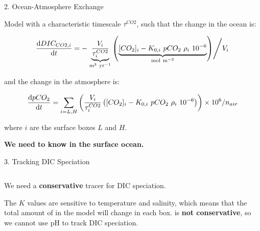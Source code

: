 \begin{frame}{2. Ocean-Atmosphere Exchange}

    Model with a characteristic timescale $\tau^{CO2}$, such that the change in the ocean is:

    $$
    \frac{\mathrm{d}DIC_{CO2,i}}{\mathrm{d}t} = - \left. \underbrace{\frac{V_i}{\tau^{CO2}_i}}_{\mathrm{m^3~yr^{-1}}} \left( \underbrace{[CO_2]_i - K_{0,i} ~ pCO_2 ~ \rho_i ~ 10^{-6}}_{\mathrm{mol~m^{-3}}} \right) \middle/ V_i \right.
    $$

    and the change in the atmosphere is:

    $$
    \frac{\mathrm{d}pCO_2}{\mathrm{d}t} = \sum_{i=L,H} \left(\frac{V_i}{\tau^{CO2}_i} \left([CO_2]_i - K_{0,i} ~ pCO_2 ~ \rho_i ~ 10^{-6} \right) \right) \times 10^{6} / n_{air}
    $$

    where $i$ are the surface boxes $L$ and $H$.
    
    \bigskip
    \textbf{We need to know \ce{[CO_2^*]} in the surface ocean.}

\end{frame}

\begin{frame}{3. Tracking DIC Speciation}

    \begin{columns}
        \begin{column}{0.5\linewidth}
            We need a \textbf{conservative} tracer for DIC speciation.
            \bigskip
        
            The $K$ values are sensitive to temperature and salinity, which means that the total amount of  in the model will change in each box. \ce{[H+]} is \textbf{not conservative}, so we cannot use pH to track DIC speciation.
            \bigskip
        \end{column}


    \end{columns}

\end{frame}

